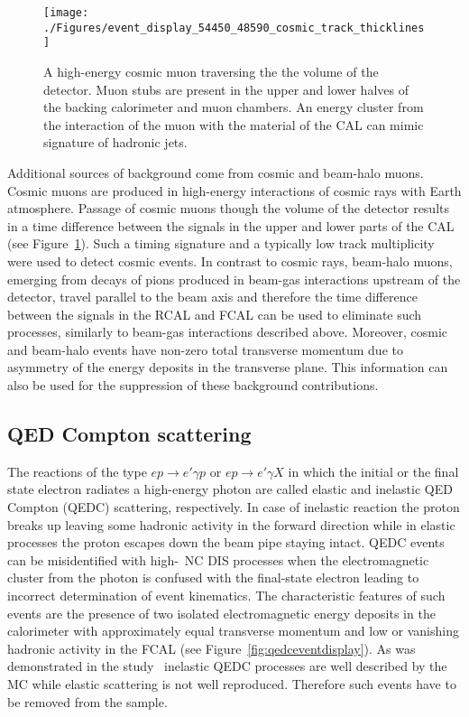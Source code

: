 \begin{figure}[htbp]
	\centering
	\texttt{[image: ./Figures/event\_display\_54450\_48590\_cosmic\_track\_thicklines]} 
	\caption{A high-energy cosmic muon traversing the the volume of the \zeus detector. Muon stubs are present in the upper and lower halves of the backing calorimeter and muon chambers. An energy cluster from the interaction of the muon with the material of the CAL can mimic signature of hadronic jets.}
	\label{fig:cosmiceventdisplay}
\end{figure}
Additional sources of background come from cosmic and beam-halo muons. Cosmic muons are produced in high-energy interactions of cosmic rays with Earth atmosphere. Passage of cosmic muons though the volume of the detector results in a time difference between the signals in the upper and lower parts of the CAL (see Figure~\ref{fig:cosmiceventdisplay}). Such a timing signature and a typically low track multiplicity were used to detect cosmic events. In contrast to cosmic rays, beam-halo muons, emerging from decays of pions produced in beam-gas interactions upstream of the detector, travel parallel to the beam axis and therefore the time difference between the signals in the RCAL and FCAL can be used to eliminate such processes, similarly to beam-gas interactions described above. Moreover, cosmic and beam-halo events have non-zero total transverse momentum due to asymmetry of the energy deposits in the transverse plane. This information can also be used for the suppression of these background contributions. 

\subsection{QED Compton scattering}
The reactions of the type $ep \rightarrow e' \gamma p$ or $ep \rightarrow e'\gamma X$ in which the initial or the final state electron radiates a high-energy photon are called elastic and inelastic QED Compton (QEDC) scattering, respectively. In case of inelastic reaction the proton breaks up leaving some hadronic activity in the forward direction while in elastic processes the proton escapes down the beam pipe staying intact. QEDC events can be misidentified with high-\qsq~NC DIS processes when the electromagnetic cluster from the photon is confused with the final-state electron leading to incorrect determination of event kinematics. The characteristic features of such events are the presence of two isolated electromagnetic energy deposits in the calorimeter with approximately equal transverse momentum and low or vanishing hadronic activity in the FCAL (see Figure~\ref{fig:qedceventdisplay}). As was demonstrated in the study~\cite{thesis:moritz:2001} inelastic QEDC processes are well described by the \djangoh MC while elastic scattering is not well reproduced. Therefore such events have to be removed from the sample.

